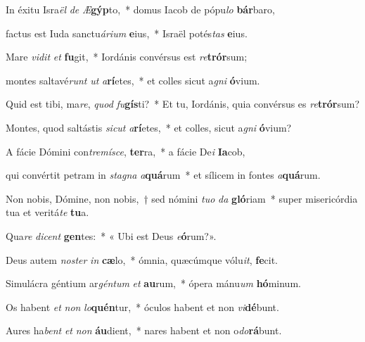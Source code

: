 \item In éxitu Isra\textit{ël} \textit{de} \textit{Æ}\textbf{gýp}to,~* domus Iacob de pópu\textit{lo} \textbf{bár}baro,

\item factus est Iuda sanctu\textit{árium} \textbf{e}ius,~* Israël potés\textit{tas} \textbf{e}ius.

\item Mare \textit{vidit} \textit{et} \textbf{fu}git,~* Iordánis convérsus est \textit{re}\textbf{trór}sum;

\item montes saltavé\textit{runt} \textit{ut} \textit{a}\textbf{rí}etes,~* et colles sicut a\textit{gni} \textbf{ó}vium.

\item Quid est tibi, ma\textit{re}, \textit{quod} \textit{fu}\textbf{gís}ti?~* Et tu, Iordánis, quia convérsus es \textit{re}\textbf{trór}sum?

\item Montes, quod saltástis \textit{sicut} \textit{a}\textbf{rí}etes,~* et colles, sicut a\textit{gni} \textbf{ó}vium?

\item A fácie Dómini con\textit{tremísce}, \textbf{ter}ra,~* a fácie De\textit{i} \textbf{Ia}cob,

\item qui convértit petram in \textit{stagna} \textit{a}\textbf{quá}rum~* et sílicem in fontes \textit{a}\textbf{quá}rum.

\item Non nobis, Dómine, non nobis,~† sed nómini \textit{tuo} \textit{da} \textbf{gló}riam~* super misericórdia tua et veritá\textit{te} \textbf{tu}a.

\item Qua\textit{re} \textit{dicent} \textbf{gen}tes:~* « Ubi est Deus \textit{e}\textbf{ó}rum?».

\item Deus autem \textit{noster} \textit{in} \textbf{cæ}lo,~* ómnia, quæcúmque vólu\textit{it}, \textbf{fe}cit.

\item Simulácra géntium ar\textit{géntum} \textit{et} \textbf{au}rum,~* ópera mánu\textit{um} \textbf{hó}minum.

\item Os habent \textit{et} \textit{non} \textit{lo}\textbf{quén}tur,~* óculos habent et non \textit{vi}\textbf{dé}bunt.

\item Aures ha\textit{bent} \textit{et} \textit{non} \textbf{áu}dient,~* nares habent et non o\textit{do}\textbf{rá}bunt.

